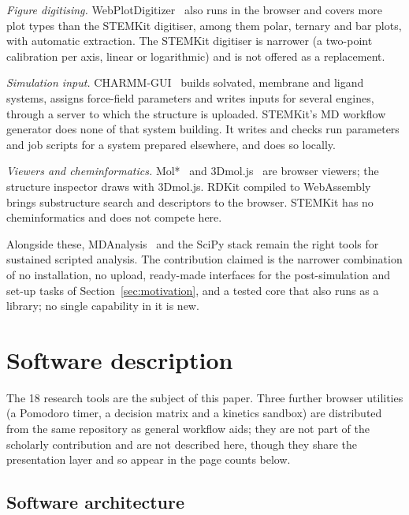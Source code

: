 \documentclass[11pt,a4paper]{article}
\begin{document}
\emph{Figure digitising.} WebPlotDigitizer~\cite{rohatgi_webplotdigitizer} also
runs in the browser and covers more plot types than the STEMKit digitiser, among
them polar, ternary and bar plots, with automatic extraction. The STEMKit
digitiser is narrower (a two-point calibration per axis, linear or logarithmic)
and is not offered as a replacement.

\emph{Simulation input.} CHARMM-GUI~\cite{jo2008charmmgui,lee2016charmmgui}
builds solvated, membrane and ligand systems, assigns force-field parameters and
writes inputs for several engines, through a server to which the structure is
uploaded. STEMKit's MD workflow generator does none of that system building. It
writes and checks run parameters and job scripts for a system prepared
elsewhere, and does so locally.

\emph{Viewers and cheminformatics.} Mol*~\cite{sehnal2021} and
3Dmol.js~\cite{rego2015} are browser viewers; the structure inspector draws with
3Dmol.js. RDKit compiled to WebAssembly~\cite{rdkit} brings substructure search
and descriptors to the browser. STEMKit has no cheminformatics and does not
compete here.

Alongside these, MDAnalysis~\cite{michaud-agrawal2011mdanalysis} and the SciPy
stack remain the right tools for sustained scripted analysis. The contribution
claimed is the narrower combination of no installation, no upload, ready-made
interfaces for the post-simulation and set-up tasks of Section~\ref{sec:motivation},
and a tested core that also runs as a library; no single capability in it is new.

\section{Software description}
\label{sec:description}

The 18 research tools are the subject of this paper. Three further browser
utilities (a Pomodoro timer, a decision matrix and a kinetics sandbox) are
distributed from the same repository as general workflow aids; they are not part
of the scholarly contribution and are not described here, though they share the
presentation layer and so appear in the page counts below.

\subsection{Software architecture}
\label{sec:architecture}
\end{document}
